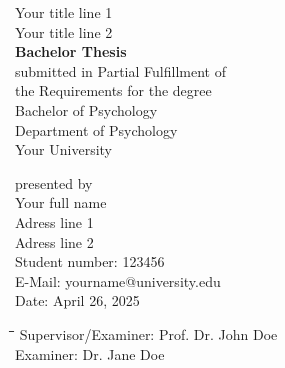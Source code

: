 \vspace*{4\baselineskip}
\thispagestyle{empty}
\begin{center}
   Your title line 1\\ Your title line 2 \\
    \vspace*{5\baselineskip}
    \textbf{Bachelor Thesis} \\
    \vspace*{2\baselineskip}
    submitted in Partial Fulfillment of \\
the Requirements for the degree\vspace{1cm} \\
Bachelor of Psychology\vspace{1cm} \\
Department of Psychology  \\
Your University \\
\vspace*{4\baselineskip}
\end{center}
presented by \\
\noindent Your full name\\
\noindent \hspace{.5in} Adress line 1 \\
\noindent\hspace{.5in} Adress line 2 \\
\noindent Student number: 123456 \\
\noindent E-Mail: yourname@university.edu \\
\noindent Date: April 26, 2025 \\
\begin{tabbing}
     \hspace*{1cm}\=\hspace*{1.5in}\=\hspace*{4cm}\=\hspace*{2.7cm}\= \kill
     Supervisor/Examiner: \> \> Prof. Dr. John Doe \\
     Examiner: \> \>  Dr. Jane Doe
\end{tabbing}
\